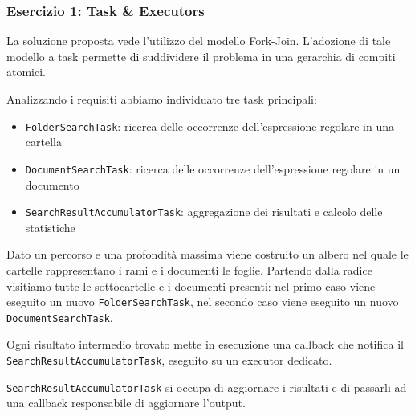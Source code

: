 \documentclass[a4paper]{article}
\begin{document}
\subsubsection{Esercizio 1: Task \& Executors}

La soluzione proposta vede l'utilizzo del modello Fork-Join.
%
L'adozione di tale modello a task permette di suddividere il problema in una gerarchia di compiti atomici.

Analizzando i requisiti abbiamo individuato tre task principali:

\begin{itemize}

    \item \texttt{FolderSearchTask}: ricerca delle occorrenze dell'espressione regolare in una cartella

    \item \texttt{DocumentSearchTask}: ricerca delle occorrenze dell'espressione regolare in un documento

    \item \texttt{SearchResultAccumulatorTask}: aggregazione dei risultati e calcolo delle statistiche

\end{itemize}

Dato un percorso e una profondit\`a massima viene costruito un albero nel quale le cartelle rappresentano i rami e i documenti le foglie.
%
Partendo dalla radice visitiamo tutte le sottocartelle e i documenti presenti: nel primo caso viene eseguito un nuovo \texttt{FolderSearchTask}, nel secondo caso viene eseguito un nuovo \texttt{DocumentSearchTask}.

Ogni risultato intermedio trovato mette in esecuzione una callback che notifica il \texttt{SearchResultAccumulatorTask}, eseguito su un executor dedicato.

\texttt{SearchResultAccumulatorTask} si occupa di aggiornare i risultati e di passarli ad una callback responsabile di aggiornare l'output.
%
\end{document}

